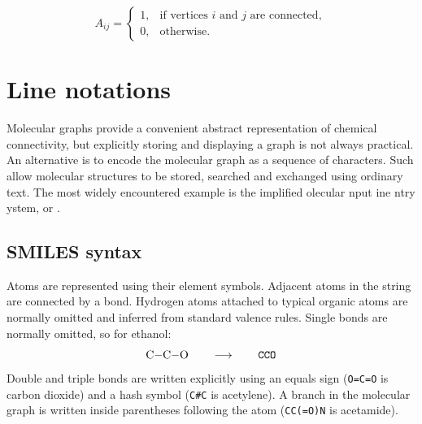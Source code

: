 \begin{equation} 
    A_{ij} = \begin{cases} 
        1, & \text{if vertices } i \text{ and } j \text{ are connected},\\ 
        0, & \text{otherwise}. 
    \end{cases} 
\end{equation}

\solution{6cm}{
    \[ \mathbf{A} = \begin{pmatrix} 0 & 1 & 0 & 0 & 1 & 0 & 0 & 0 \\ 1 & 0 & 1 & 0 & 0 & 1 & 0 & 0 \\ 0 & 1 & 0 & 1 & 0 & 0 & 0 & 0 \\ 0 & 0 & 1 & 0 & 1 & 0 & 0 & 0 \\ 1 & 0 & 0 & 1 & 0 & 0 & 0 & 0 \\ 0 & 1 & 0 & 0 & 0 & 0 & 1 & 1 \\ 0 & 0 & 0 & 0 & 0 & 1 & 0 & 0 \\ 0 & 0 & 0 & 0 & 0 & 1 & 0 & 0 \end{pmatrix}. \] 
}

\section{Line notations}

Molecular graphs provide a convenient abstract representation of chemical connectivity, but explicitly storing and displaying a graph is not always practical.
An alternative is to encode the molecular graph as a sequence of characters. Such  allow molecular structures to be stored, searched and exchanged using ordinary text.
The most widely encountered example is the implified olecular nput ine ntry ystem, or .

\subsection{SMILES syntax}

Atoms are represented using their element symbols.
Adjacent atoms in the string are connected by a bond.
Hydrogen atoms attached to typical organic atoms are normally omitted and inferred from standard valence rules.
Single bonds are normally omitted, so for ethanol: 
\begin{equation} 
    \ce{C-C-O} \qquad\longrightarrow\qquad \texttt{CCO} 
\end{equation} 
Double and triple bonds are written explicitly using an equals sign (\texttt{O=C=O} is carbon dioxide) and a hash symbol (\texttt{C\#C} is acetylene).
A branch in the molecular graph is written inside parentheses following the atom (\texttt{CC(=O)N} is acetamide).

